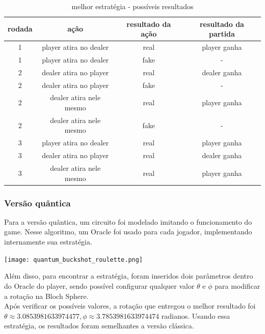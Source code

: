 \documentclass{article}
\begin{document}
\begin{table}[!h]
	\begin{center}
		\begin{tabular}{ |c|c|c|c| } 
			\hline
			rodada & ação & resultado da ação & resultado da partida \\
			\hline
			1 & player atira no dealer  & real & player ganha\\
			\hline
			1 & player atira no dealer  & fake & -\\
			\hline
			2 & dealer atira no player  & real & dealer ganha\\
			\hline
			2 & dealer atira no player  & fake & -\\
			\hline
			2 & dealer atira nele mesmo  & real & player ganha\\
			\hline
			2 & dealer atira nele mesmo  & fake & -\\
			\hline
			3 & player atira no dealer  & real & player ganha\\
			\hline
			3 & dealer atira no player & real & dealer ganha\\
			\hline
			3 & dealer atira nele mesmo  & real & player ganha\\
			\hline
		\end{tabular}
		\caption{melhor estratégia - possíveis resultados}
	\end{center}
\end{table}

\subsubsection{Versão quântica}
Para a versão quântica, um circuito foi modelado imitando o funcionamento do game. Nesse algoritmo, um Oracle foi usado para cada jogador, implementando internamente sua estratégia.

\begin{center}
	\texttt{[image: quantum\_buckshot\_roulette.png]}
	\label{fig:bckr-circuit}
\end{center}

Além disso, para encontrar a estratégia, foram inseridos dois parâmetros dentro do Oracle do player, sendo possível configurar qualquer valor $\theta$ e $\phi$ para modificar a rotação na Bloch Sphere.\\
Após verificar os possíveis valores, a rotação que entregou o melhor resultado foi $\theta\approx 3.0853981633974477, \phi\approx3.7853981633974474$ radianos. Usando essa estratégia, os resultados foram semelhantes a versão clássica.
\end{document}
